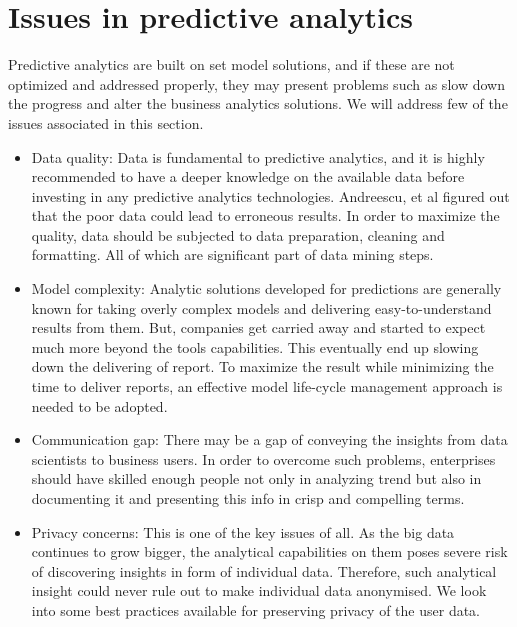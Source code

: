 \documentclass[runningheads]{llncs}
\begin{document}
\section{Issues in predictive analytics}
Predictive analytics are built on set model solutions, and if these are not optimized and addressed properly, they may present problems such as slow down the progress and alter the business analytics solutions. We will address few of the issues associated in this section.
\begin{itemize}
	\item Data quality: Data is fundamental to predictive analytics, and it is highly recommended to have a deeper knowledge on the available data before investing in any predictive analytics technologies. Andreescu, et al figured out that the poor data could lead to erroneous results. In order to maximize the quality, data should be subjected to data preparation, cleaning and formatting. All of which are significant part of data mining steps.\\
	\item Model complexity: Analytic solutions developed for predictions are generally known for taking overly complex models and delivering easy-to-understand results from them. But, companies get carried away and started to expect much more beyond the tools capabilities. This eventually end up slowing down the delivering of report. To maximize the result while minimizing the time to deliver reports, an effective model life-cycle management approach is needed to be adopted.\\
	\item Communication gap: There may be a gap of conveying the insights from data scientists to business users. In order to overcome such problems, enterprises should have skilled enough people not only in analyzing trend but also in documenting it and presenting this info in crisp and compelling terms.\\
	\item Privacy concerns: This is one of the key issues of all. As the big data continues to grow bigger, the analytical capabilities on them poses severe risk of discovering insights in form of individual data. Therefore, such analytical insight could never rule out to make individual data anonymised. We look into some best practices available for preserving privacy of the user data. 
\end{itemize}
\end{document}

